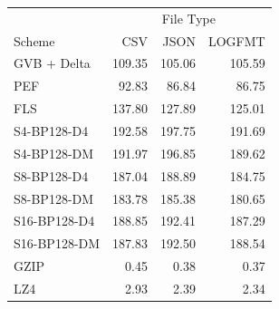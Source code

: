\begin{tabular}{lrrr}
\toprule
 & \multicolumn{3}{c}{File Type} \\
Scheme & CSV & JSON & LOGFMT \\
\midrule
GVB + Delta & 109.35 & 105.06 & 105.59 \\
PEF & 92.83 & 86.84 & 86.75 \\
FLS & 137.80 & 127.89 & 125.01 \\
S4-BP128-D4 & 192.58 & 197.75 & 191.69 \\
S4-BP128-DM & 191.97 & 196.85 & 189.62 \\
S8-BP128-D4 & 187.04 & 188.89 & 184.75 \\
S8-BP128-DM & 183.78 & 185.38 & 180.65 \\
S16-BP128-D4 & 188.85 & 192.41 & 187.29 \\
S16-BP128-DM & 187.83 & 192.50 & 188.54 \\
GZIP & 0.45 & 0.38 & 0.37 \\
LZ4 & 2.93 & 2.39 & 2.34 \\
\bottomrule
\end{tabular}
